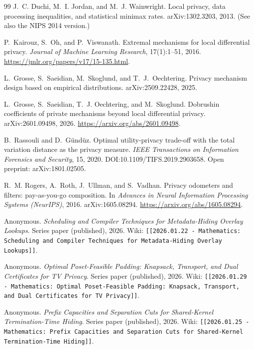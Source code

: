 \documentclass[11pt]{article}
\begin{document}
\begin{thebibliography}{99}
J.~C. Duchi, M.~I. Jordan, and M.~J. Wainwright.
\newblock Local privacy, data processing inequalities, and statistical minimax rates.
\newblock arXiv:1302.3203, 2013.
\newblock (See also the NIPS 2014 version.)

P.~Kairouz, S.~Oh, and P.~Viswanath.
\newblock Extremal mechanisms for local differential privacy.
\newblock \emph{Journal of Machine Learning Research}, 17(1):1--51, 2016.
\newblock \url{https://jmlr.org/papers/v17/15-135.html}.

L.~Grosse, S.~Saeidian, M.~Skoglund, and T.~J.~Oechtering.
\newblock Privacy mechanism design based on empirical distributions.
\newblock arXiv:2509.22428, 2025.

L.~Grosse, S.~Saeidian, T.~J. Oechtering, and M.~Skoglund.
\newblock Dobrushin coefficients of private mechanisms beyond local differential privacy.
\newblock arXiv:2601.09498, 2026. \url{https://arxiv.org/abs/2601.09498}.


B.~Rassouli and D.~G\"und\"uz.
\newblock Optimal utility-privacy trade-off with the total variation distance as the privacy measure.
\newblock \emph{IEEE Transactions on Information Forensics and Security}, 15, 2020.
\newblock DOI:10.1109/TIFS.2019.2903658.
\newblock Open preprint: arXiv:1801.02505.

R.~M. Rogers, A.~Roth, J.~Ullman, and S.~Vadhan.
\newblock Privacy odometers and filters: pay-as-you-go composition.
\newblock In \emph{Advances in Neural Information Processing Systems (NeurIPS)}, 2016.
\newblock arXiv:1605.08294. \url{https://arxiv.org/abs/1605.08294}.

Anonymous.
\newblock \emph{Scheduling and Compiler Techniques for Metadata-Hiding Overlay Lookups}.
\newblock Series paper (published), 2026.
\newblock Wiki: \texttt{[[2026.01.22 - Mathematics: Scheduling and Compiler Techniques for Metadata-Hiding Overlay Lookups]]}.


Anonymous.
\newblock \emph{Optimal Poset-Feasible Padding: Knapsack, Transport, and Dual Certificates for TV Privacy}.
\newblock Series paper (published), 2026.
\newblock Wiki: \texttt{[[2026.01.29 - Mathematics: Optimal Poset-Feasible Padding: Knapsack, Transport, and Dual Certificates for TV Privacy]]}.


Anonymous.
\newblock \emph{Prefix Capacities and Separation Cuts for Shared-Kernel Termination-Time Hiding}.
\newblock Series paper (published), 2026.
\newblock Wiki: \texttt{[[2026.01.25 - Mathematics: Prefix Capacities and Separation Cuts for Shared-Kernel Termination-Time Hiding]]}.



\end{thebibliography}
\end{document}
